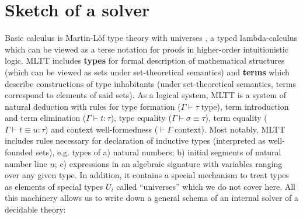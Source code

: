 \documentclass[manuscript,screen,review]{acmart}
\begin{document}
\section{Sketch of a solver}

Basic calculus is Martin-L\"of type theory with universes \cite{mltt}, a typed
lambda-calculus which can be viewed as a terse notation for proofs in
higher-order intuitionistic logic. MLTT includes \textbf{types} for formal
description of mathematical structures (which can be viewed as sets under
set-theoretical semantics) and \textbf{terms} which describe constructions of
type inhabitants (under set-theoretical semantics, terms correspond to elements
of said sets). As a logical system, MLTT is a system of natural deduction with
rules for type formation ($\Gamma \vdash \tau \; \mathrm{type}$), term
introduction and term elimination ($\Gamma \vdash t : \tau$), type equality
($\Gamma \vdash \sigma \equiv \tau$), term equality
($\Gamma \vdash t \equiv u : \tau$) and context well-formedness
($\vdash \Gamma \; \mathrm{context}$). Most notably, MLTT includes rules
necessary for declaration of inductive types (interpreted as well-founded sets),
e.g. types of a) natural numbers; b) initial segments of natural number line
$\underline{n}$; c) expressions in an algebraic signature with variables ranging
over any given type. In addition, it contains a special mechanism to treat types
as elements of special types $U_i$ called ``universes'' which we do not cover
here. All this machinery allows us to write down a general schema of an internal
solver of a decidable theory:
\end{document}
